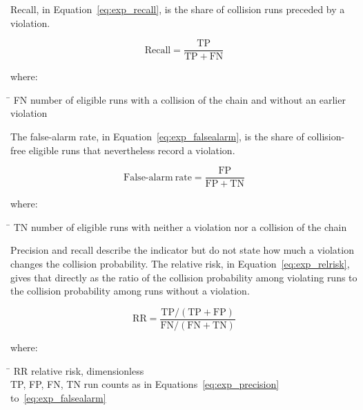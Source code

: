 Recall, in Equation~\eqref{eq:exp_recall}, is the share of collision runs
preceded by a violation.

\begin{equation}
    \mathrm{Recall} = \frac{\mathrm{TP}}{\mathrm{TP} + \mathrm{FN}}
    \label{eq:exp_recall}
\end{equation}

where:\nopagebreak
\begin{tabbing}
    \hspace{2.2cm} \= \kill
    FN \> number of eligible runs with a collision of the chain and without an earlier violation
\end{tabbing}

The false-alarm rate, in Equation~\eqref{eq:exp_falsealarm}, is the share of
collision-free eligible runs that nevertheless record a violation.

\begin{equation}
    \mathrm{False\text{-}alarm\ rate} = \frac{\mathrm{FP}}{\mathrm{FP} + \mathrm{TN}}
    \label{eq:exp_falsealarm}
\end{equation}

where:\nopagebreak
\begin{tabbing}
    \hspace{2.2cm} \= \kill
    TN \> number of eligible runs with neither a violation nor a collision of the chain
\end{tabbing}

Precision and recall describe the indicator but do not state how much a violation
changes the collision probability. The relative risk, in
Equation~\eqref{eq:exp_relrisk}, gives that directly as the ratio of the
collision probability among violating runs to the collision probability among
runs without a violation.

\begin{equation}
    \mathrm{RR} = \frac{\mathrm{TP} / (\mathrm{TP} + \mathrm{FP})}
                       {\mathrm{FN} / (\mathrm{FN} + \mathrm{TN})}
    \label{eq:exp_relrisk}
\end{equation}

where:\nopagebreak
\begin{tabbing}
    \hspace{2.2cm} \= \kill
    RR \> relative risk, dimensionless \\
    TP, FP, FN, TN \> run counts as in Equations~\eqref{eq:exp_precision} to~\eqref{eq:exp_falsealarm}
\end{tabbing}

